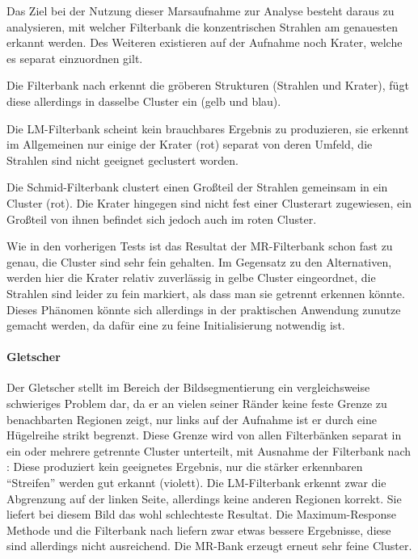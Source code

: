 Das Ziel bei der Nutzung dieser Marsaufnahme zur Analyse besteht daraus zu analysieren, mit welcher Filterbank die konzentrischen Strahlen am genauesten erkannt werden. Des Weiteren existieren auf der Aufnahme noch Krater, welche es separat einzuordnen gilt.

Die Filterbank nach \cite{jain_91} erkennt die gröberen Strukturen (Strahlen und Krater), fügt diese allerdings in dasselbe Cluster ein (gelb und blau).

Die LM-Filterbank scheint kein brauchbares Ergebnis zu produzieren, sie erkennt im Allgemeinen nur einige der Krater (rot) separat von deren Umfeld, die Strahlen sind nicht geeignet geclustert worden.

Die Schmid-Filterbank clustert einen Großteil der Strahlen gemeinsam in ein Cluster (rot). Die Krater hingegen sind nicht fest einer Clusterart zugewiesen, ein Großteil von ihnen befindet sich jedoch auch im roten Cluster.

Wie in den vorherigen Tests ist das Resultat der MR-Filterbank schon fast zu genau, die Cluster sind sehr fein gehalten. Im Gegensatz zu den Alternativen, werden hier die Krater relativ zuverlässig in gelbe Cluster eingeordnet, die Strahlen sind leider zu fein markiert, als dass man sie getrennt erkennen könnte. Dieses Phänomen könnte sich allerdings in der praktischen Anwendung zunutze gemacht werden, da dafür eine zu feine Initialisierung notwendig ist.

\paragraph{Gletscher}

Der Gletscher stellt im Bereich der Bildsegmentierung ein vergleichsweise schwieriges Problem dar, da er an vielen seiner Ränder keine feste Grenze zu benachbarten Regionen zeigt, nur links auf der Aufnahme ist er durch eine Hügelreihe strikt begrenzt. Diese Grenze wird von allen Filterbänken separat in ein oder mehrere getrennte Cluster unterteilt, mit Ausnahme der Filterbank nach \cite{jain_91}: Diese produziert kein geeignetes Ergebnis, nur die stärker erkennbaren \enquote{Streifen} werden gut erkannt (violett). Die LM-Filterbank erkennt zwar die Abgrenzung auf der linken Seite, allerdings keine anderen Regionen korrekt. Sie liefert bei diesem Bild das wohl schlechteste Resultat. Die Maximum-Response Methode und die Filterbank nach \cite{schmid_01} liefern zwar etwas bessere Ergebnisse, diese sind allerdings nicht ausreichend. Die MR-Bank erzeugt erneut sehr feine Cluster.

